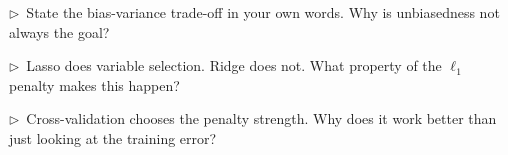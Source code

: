 \begin{reflect}
$\triangleright$~State the bias-variance trade-off in your own words. Why is unbiasedness not always the goal?

\smallskip
$\triangleright$~Lasso does variable selection. Ridge does not. What property of the $\ell_1$ penalty makes this happen?

\smallskip
$\triangleright$~Cross-validation chooses the penalty strength. Why does it work better than just looking at the training error?
\end{reflect}

